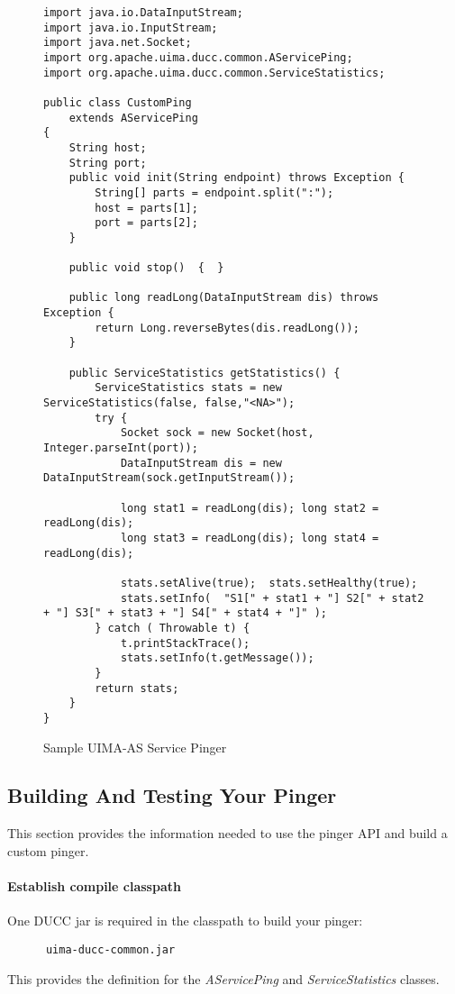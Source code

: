       \begin{figure}[H]
\begin{verbatim}
import java.io.DataInputStream;
import java.io.InputStream;
import java.net.Socket;
import org.apache.uima.ducc.common.AServicePing;
import org.apache.uima.ducc.common.ServiceStatistics;

public class CustomPing
    extends AServicePing
{
    String host;
    String port;
    public void init(String endpoint) throws Exception {
        String[] parts = endpoint.split(":");
        host = parts[1];
        port = parts[2];
    }

    public void stop()  {  }

    public long readLong(DataInputStream dis) throws Exception {
        return Long.reverseBytes(dis.readLong());
    }

    public ServiceStatistics getStatistics() {
        ServiceStatistics stats = new ServiceStatistics(false, false,"<NA>");
        try {
            Socket sock = new Socket(host, Integer.parseInt(port));
            DataInputStream dis = new DataInputStream(sock.getInputStream());

            long stat1 = readLong(dis); long stat2 = readLong(dis); 
            long stat3 = readLong(dis); long stat4 = readLong(dis);

            stats.setAlive(true);  stats.setHealthy(true);
            stats.setInfo(  "S1[" + stat1 + "] S2[" + stat2 + "] S3[" + stat3 + "] S4[" + stat4 + "]" );
        } catch ( Throwable t) {
        	t.printStackTrace();
            stats.setInfo(t.getMessage());
        }
        return stats;        
    }
}
\end{verbatim}
        \caption{Sample UIMA-AS Service Pinger}
        \label{fig:service.custom.pinger}

      \end{figure}
      
      \subsection{Building And Testing Your Pinger}
      This section provides the information needed to use the pinger API and build a
      custom pinger. 

      \paragraph{Establish compile classpath} One DUCC jar is required in the classpath to build your pinger:
\begin{verbatim}
      uima-ducc-common.jar
\end{verbatim}      
      This provides the definition for the {\em AServicePing} and {\em ServiceStatistics} classes.

